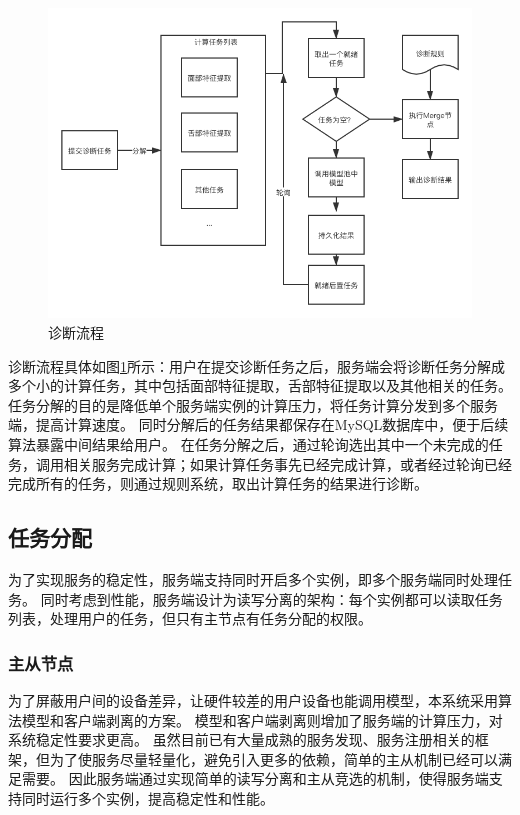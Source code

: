 \begin{figure}[ht]
    \centering
    \includegraphics[width=12cm]{images/sketch3.png}
    \caption{诊断流程}
    \label{fig:sketch}
\end{figure}

诊断流程具体如图\ref{fig:sketch}所示：用户在提交诊断任务之后，服务端会将诊断任务分解成多个小的计算任务，其中包括面部特征提取，舌部特征提取以及其他相关的任务。任务分解的目的是降低单个服务端实例的计算压力，将任务计算分发到多个服务端，提高计算速度。
同时分解后的任务结果都保存在MySQL数据库中，便于后续算法暴露中间结果给用户。
在任务分解之后，通过轮询选出其中一个未完成的任务，调用相关服务完成计算；如果计算任务事先已经完成计算，或者经过轮询已经完成所有的任务，则通过规则系统，取出计算任务的结果进行诊断。



\subsection{任务分配}
为了实现服务的稳定性，服务端支持同时开启多个实例，即多个服务端同时处理任务。
同时考虑到性能，服务端设计为读写分离的架构：每个实例都可以读取任务列表，处理用户的任务，但只有主节点有任务分配的权限。


\subsubsection{主从节点}
为了屏蔽用户间的设备差异，让硬件较差的用户设备也能调用模型，本系统采用算法模型和客户端剥离的方案。
模型和客户端剥离则增加了服务端的计算压力，对系统稳定性要求更高。
虽然目前已有大量成熟的服务发现、服务注册相关的框架，但为了使服务尽量轻量化，避免引入更多的依赖，简单的主从机制已经可以满足需要。
因此服务端通过实现简单的读写分离和主从竞选的机制，使得服务端支持同时运行多个实例，提高稳定性和性能。

